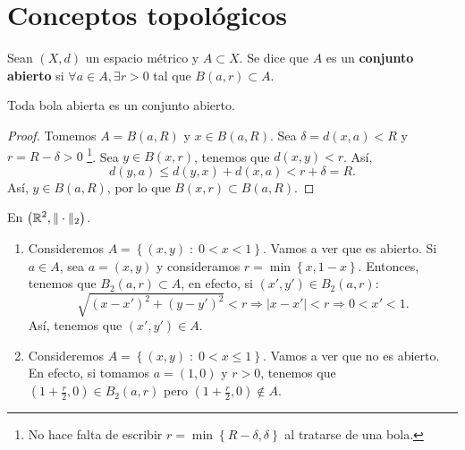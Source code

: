 \section{Conceptos topológicos}
\begin{definition}
Sean $\displaystyle \left(X,d\right) $ un espacio métrico y $\displaystyle A \subset X $. Se dice que $\displaystyle A $ es un \textbf{conjunto abierto} si $\displaystyle \forall a \in A, \exists r> 0 $ tal que $\displaystyle B\left(a,r\right) \subset A $.
\end{definition}
\begin{prop}
Toda bola abierta es un conjunto abierto.
\end{prop}
\begin{proof}
	Tomemos $\displaystyle A = B\left(a,R\right) $ y $\displaystyle x \in B\left(a,R\right) $. Sea $\displaystyle \delta = d\left(x, a\right) < R $ y $\displaystyle r = R - \delta > 0 $ \footnote{No hace falta de escribir $\displaystyle r = \min \left\{ R - \delta, \delta \right\} $ al tratarse de una bola.}. Sea $\displaystyle y \in B\left(x,r\right) $, tenemos que $\displaystyle d\left(x,y\right) < r $. Así, 
\[d\left(y,a\right) \leq d\left(y,x\right) + d\left(x,a\right) < r + \delta = R .\]
Así, $\displaystyle y \in B\left(a,R\right) $, por lo que $\displaystyle B\left(x,r\right) \subset B\left(a,R\right) $.
\end{proof}
\begin{eg}
En $\displaystyle \left(\mathbb{R}^{2}, \| \cdot \|_{2}\right) $.
\begin{enumerate}
	\item Consideremos $\displaystyle A = \left\{ \left(x,y\right) \; : \; 0 < x < 1\right\}  $. Vamos a ver que es abierto. Si $\displaystyle a \in A $, sea $\displaystyle a = \left(x,y\right) $ y consideramos $\displaystyle r = \min \left\{ x, 1 - x\right\}  $. Entonces, tenemos que $\displaystyle B_{2}\left(a,r\right) \subset A $, en efecto, si $\displaystyle \left(x', y'\right) \in B_{2}\left(a,r\right) $:
\[\sqrt{\left(x-x'\right)^{2} + \left(y-y'\right)^{2}} < r \Rightarrow \left|x - x'\right| < r \Rightarrow 0 < x' < 1.\]
Así, tenemos que $\displaystyle \left(x',y'\right)\in A $.
\item Consideremos $\displaystyle A = \left\{ \left(x,y\right) \; : \; 0 < x \leq 1\right\}  $. Vamos a ver que no es abierto. En efecto, si tomamos $\displaystyle a = \left(1,0\right) $ y $\displaystyle r > 0 $,
	tenemos que $\displaystyle \left(1 + \frac{r}{2}, 0\right) \in B_{2}\left(a,r\right) $ pero $\displaystyle \left(1 + \frac{r}{2}, 0\right) \not\in A $. 
\end{enumerate}
\end{eg}
